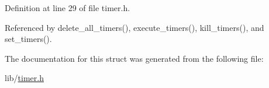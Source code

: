 Definition at line 29 of file timer.\-h.



Referenced by delete\-\_\-all\-\_\-timers(), execute\-\_\-timers(), kill\-\_\-timers(), and set\-\_\-timers().



The documentation for this struct was generated from the following file\-:\begin{DoxyCompactItemize}
\item 
lib/\hyperlink{timer_8h}{timer.\-h}\end{DoxyCompactItemize}

